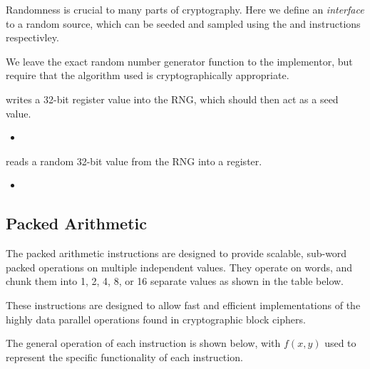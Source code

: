 Randomness is crucial to many parts of cryptography. Here we define an 
{\em interface} to a random source, which can be seeded and sampled using
the  and  instructions respectivley.

We leave the exact random number generator function to the implementor,
but require that the algorithm used is cryptographically appropriate.

{\iencrseedcr}
{
 writes a 32-bit register value into the RNG, which should
then act as a seed value.
}{
\begin{itemize}
\item {}
\end{itemize}
}{}

{\iencrsampcr}
{
 reads a random 32-bit value from the RNG into a register.
}{
\begin{itemize}
\item {}
\end{itemize}
}{}


\subsection{Packed Arithmetic}
\label{sec:packed-arithmetic-instructions}

The packed arithmetic instructions are designed to provide scalable, sub-word
packed operations on multiple independent values. They operate on words, and
chunk them into 1, 2, 4, 8, or 16 separate values as shown in the table
below.

These instructions are designed to allow fast and efficient implementations
of the highly data parallel operations found in cryptographic block ciphers.

The general operation of each instruction is shown below, with $f(x,y)$
used to represent the specific functionality of each instruction.

\medskip

